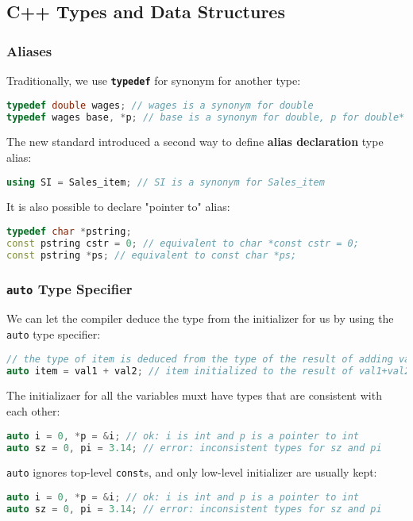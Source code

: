 \subsection{C++ Types and Data Structures}
\label{task:20231123_cpp}

\subsubsection{Aliases}

Traditionally, we use \textbf{\texttt{typedef}} for synonym for another type:
\begin{lstlisting}[language=C++]
typedef double wages; // wages is a synonym for double 
typedef wages base, *p; // base is a synonym for double, p for double*
\end{lstlisting}


The new standard introduced a second way to define \textbf{alias declaration} type alias:
\begin{lstlisting}[language=C++]
using SI = Sales_item; // SI is a synonym for Sales_item
\end{lstlisting}

It is also possible to declare "pointer to" alias:
\begin{lstlisting}[language=C++]
typedef char *pstring; 
const pstring cstr = 0; // equivalent to char *const cstr = 0; 
const pstring *ps; // equivalent to const char *ps;
\end{lstlisting}

\subsubsection{\texttt{auto} Type Specifier}

We can let the compiler deduce the type from the initializer for us by using the \texttt{auto} type specifier:
\begin{lstlisting}[language=C++]
// the type of item is deduced from the type of the result of adding val1 and val2 
auto item = val1 + val2; // item initialized to the result of val1+val2
\end{lstlisting}

The initializaer for all the variables muxt have types that are consistent with each other:
\begin{lstlisting}[language=C++]
auto i = 0, *p = &i; // ok: i is int and p is a pointer to int 
auto sz = 0, pi = 3.14; // error: inconsistent types for sz and pi
\end{lstlisting}

\texttt{auto} ignores top-level \texttt{const}s, and only low-level initializer are usually kept:
\begin{lstlisting}[language=C++]
auto i = 0, *p = &i; // ok: i is int and p is a pointer to int 
auto sz = 0, pi = 3.14; // error: inconsistent types for sz and pi
\end{lstlisting}